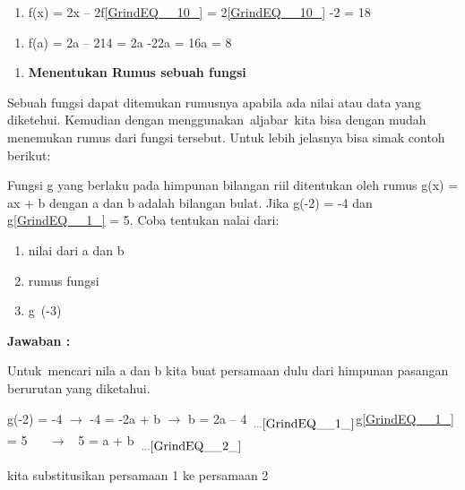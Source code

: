 \documentclass[11pt,fleqn]{book} %
\begin{document}
\begin{myEnumerate}
\begin{itemize}
\begin{enumerate}
\item  f(x) = 2x -- 2f\eqref{GrindEQ__10_} = 2\eqref{GrindEQ__10_} -2 = 18
\end{enumerate}

\noindent 

\begin{enumerate}
\item  f(a) = 2a -- 214 = 2a -22a = 16a = 8
\end{enumerate}

\noindent 

\begin{enumerate}
\item  \textbf{ Menentukan Rumus sebuah fungsi}
\end{enumerate}

\noindent 

\noindent Sebuah fungsi dapat ditemukan rumusnya apabila ada nilai atau data yang diketehui. Kemudian dengan menggunakan~aljabar~kita bisa dengan mudah menemukan rumus dari fungsi tersebut. Untuk lebih jelasnya bisa simak contoh berikut:

\noindent 

\noindent Fungsi g yang berlaku pada himpunan bilangan riil ditentukan oleh rumus g(x) = ax + b dengan a dan b adalah bilangan bulat. Jika g(-2) = -4 dan g\eqref{GrindEQ__1_} = 5. Coba tentukan nalai dari:

\noindent 

\begin{enumerate}
\item  nilai dari a dan b

\item  rumus fungsi

\item  g~(-3)
\end{enumerate}

\noindent 

\textbf{Jawaban :}

\textbf{}

\noindent Untuk~mencari nila a dan b kita buat persamaan dulu dari himpunan pasangan berurutan yang diketahui.

\noindent g(-2) = -4 $\mathrm{\to}$ -4 = -2a + b $\mathrm{\to}$ b = 2a -- 4~${}_{{\dots}\eqref{GrindEQ__1_}}$g\eqref{GrindEQ__1_} = 5 ~ ~$\mathrm{\to}$ ~5 = a + b~${}_{{\dots}\eqref{GrindEQ__2_}}$

\noindent kita substitusikan persamaan 1 ke persamaan 2


\end{itemize}
\end{myEnumerate}
\end{document}
